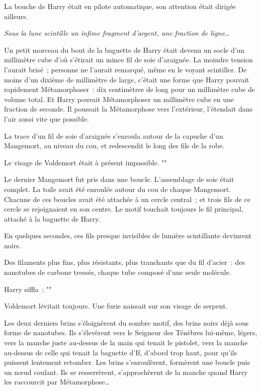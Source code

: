 La bouche de Harry était en pilote automatique, son attention était dirigée ailleurs.

\emph{Sous la lune scintille un infime fragment d'argent, une fraction de ligne…}

Un petit morceau du bout de la baguette de Harry était devenu un socle d'un millimètre cube d'où s'étirait un mince fil de soie d'araignée. La moindre tension l'aurait brisé~; personne ne l'aurait remarqué, même en le voyant scintiller. De moins d'un dixième de millimètre de large, c'était une forme que Harry pouvait rapidement Métamorphoser~: dix centimètres de long pour un millimètre cube de volume total. Et Harry pouvait Métamorphoser un millimètre cube en une fraction de seconde. Il poussait la Métamorphose vers l'extérieur, l'étendait dans l'air aussi vite que possible.

La trace d'un fil de soie d'araignée s'enroula autour de la capuche d'un Mangemort, au niveau du cou, et redescendit le long des fils de la robe.

Le visage de Voldemort était à présent impassible. ""

Le dernier Mangemort fut pris dans une boucle. L'assemblage de soie était complet. La toile avait été enroulée autour du cou de chaque Mangemort. Chacune de ces boucles avait été attachée à un cercle central~; et trois fils de ce cercle se rejoignaient en son centre. Le motif touchait toujours le fil principal, attaché à la baguette de Harry.

En quelques secondes, ces fils presque invisibles de lumière scintillante devinrent noirs.

Des filaments plus fins, plus résistants, plus tranchants que du fil d'acier~: des nanotubes de carbone tressés, chaque tube composé d'une seule molécule.

Harry siffla~: ""

Voldemort lévitait toujours. Une furie naissait sur son visage de serpent.

Les deux derniers brins s'éloignèrent du sombre motif, des brins noirs déjà sous forme de nanotubes. Ils s'élevèrent vers le Seigneur des Ténèbres lui-même, légers, vers la manche juste au-dessus de la main qui tenait le pistolet, vers la manche au-dessus de celle qui tenait la baguette d'If, d'abord trop haut, pour qu'ils puissent lentement retomber. Les brins s'enroulèrent, formèrent une boucle puis un nœud coulant. Ils se resserrèrent, s'approchèrent de la manche quand Harry les raccourcit par Métamorphose…

